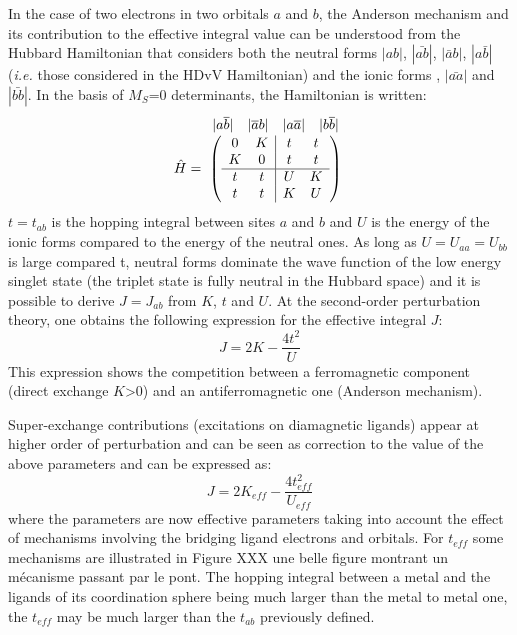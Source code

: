 \documentclass[12pt]{report}
\numberwithin{equation}{section}
\begin{document}
 In the case of two electrons in two orbitals $a$ and $b$, the Anderson mechanism and its contribution to the effective integral value can be understood from the Hubbard Hamiltonian that considers both the neutral forms $|ab|$, $|\bar{ab}|$, $|\bar{a}b|$, $|a\bar{b}|$ (\textit{i.e.} those considered in the HDvV Hamiltonian) and the ionic forms , $|\bar{aa}|$ and  $|\bar{bb}|$.
 In the basis of $M_S$=0 determinants, the Hamiltonian is written:
\[ \hat{H}=
\overset{
    \begin{array}{c c c c}
      |a\overline{b}| & |\overline{a}b| & |a\overline{a}| & |b\overline{b}|\\ 
    \end{array}
  }{
    \left(
  \begin{array}{ c c | c c }
  0  &  K &  t &  t\\
  K & 0 & t & t \\
  \hline
  t & t & U & K \\
  t & t & K & U 
  \end{array}
  \right)
  }
\]
 $t=t_{ab}$ is the hopping integral between sites $a$ and $b$ and $U$ is the energy of the ionic forms compared to the energy of the neutral ones.
 As long as $U=U_{aa}=U_{bb}$ is large compared t, neutral forms dominate the wave function of the low energy singlet state (the triplet state is fully neutral in the Hubbard space) and it is possible to derive $J=J_{ab}$ from $K$, $t$ and $U$.
 At the second-order perturbation theory, one obtains the following expression for the effective integral $J$:
\begin{equation}
    J=2K-\frac{4t^2}{U}
\end{equation}
This expression shows the competition between a ferromagnetic component (direct exchange $K$>0) and an antiferromagnetic one (Anderson mechanism).

Super-exchange contributions (excitations on diamagnetic ligands) appear at higher order of perturbation and can be seen as correction to the value of the above parameters and can be expressed as:
\begin{equation}
	J=2K_{eff}-\frac{4t_{eff}^2}{U_{eff}}
\end{equation}
where the parameters are now effective parameters taking into account the effect of mechanisms involving the bridging ligand electrons and orbitals.
For $t_{eff}$ some mechanisms are illustrated in Figure XXX une belle figure montrant un mécanisme passant par le pont.
The hopping integral between a metal and the ligands of its coordination sphere being much larger than the metal to metal one, the $t_{eff}$ may be much larger than the $t_{ab}$ previously defined.
\end{document}
